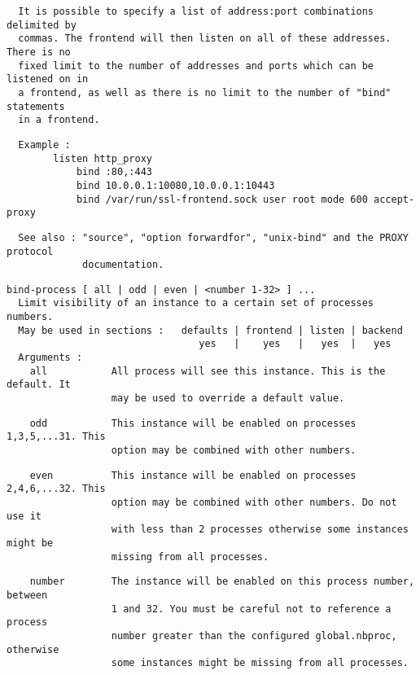 \begin{verbatim}
  It is possible to specify a list of address:port combinations delimited by
  commas. The frontend will then listen on all of these addresses. There is no
  fixed limit to the number of addresses and ports which can be listened on in
  a frontend, as well as there is no limit to the number of "bind" statements
  in a frontend.
\end{verbatim}

\begin{verbatim}
  Example :
        listen http_proxy
            bind :80,:443
            bind 10.0.0.1:10080,10.0.0.1:10443
            bind /var/run/ssl-frontend.sock user root mode 600 accept-proxy
\end{verbatim}

\begin{verbatim}
  See also : "source", "option forwardfor", "unix-bind" and the PROXY protocol
             documentation.
\end{verbatim}

\begin{verbatim}
bind-process [ all | odd | even | <number 1-32> ] ...
  Limit visibility of an instance to a certain set of processes numbers.
  May be used in sections :   defaults | frontend | listen | backend
                                 yes   |    yes   |   yes  |   yes
  Arguments :
    all           All process will see this instance. This is the default. It
                  may be used to override a default value.
\end{verbatim}

\begin{verbatim}
    odd           This instance will be enabled on processes 1,3,5,...31. This
                  option may be combined with other numbers.
\end{verbatim}

\begin{verbatim}
    even          This instance will be enabled on processes 2,4,6,...32. This
                  option may be combined with other numbers. Do not use it
                  with less than 2 processes otherwise some instances might be
                  missing from all processes.
\end{verbatim}

\begin{verbatim}
    number        The instance will be enabled on this process number, between
                  1 and 32. You must be careful not to reference a process
                  number greater than the configured global.nbproc, otherwise
                  some instances might be missing from all processes.
\end{verbatim}

